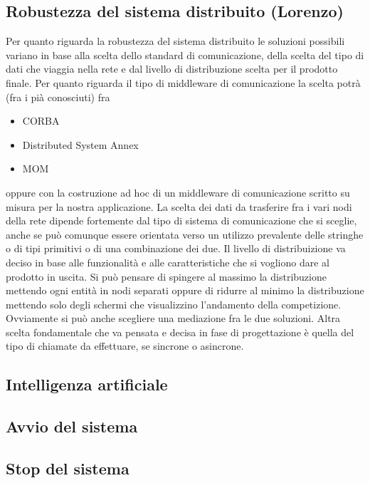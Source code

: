 \subsection{Robustezza del sistema distribuito (Lorenzo)}
Per quanto riguarda la robustezza del sistema distribuito le soluzioni possibili variano in base alla scelta dello standard di comunicazione, della scelta del tipo di dati che viaggia nella rete e dal livello di distribuzione scelta per il prodotto finale.
Per quanto riguarda il tipo di middleware di comunicazione la scelta potr\`{a} (fra i pià conosciuti) fra
\begin{itemize}
\item CORBA
\item Distributed System Annex 
\item MOM
\end{itemize}
oppure con la costruzione ad hoc di un middleware di comunicazione scritto su misura per la nostra applicazione.
La scelta dei dati da trasferire fra i vari nodi della rete dipende fortemente dal tipo di sistema di comunicazione che si sceglie, anche se può comunque essere orientata verso un utilizzo prevalente delle stringhe o di tipi primitivi o di una combinazione dei due. Il livello di distribuizione va deciso in base alle funzionalit\`{a} e alle caratteristiche che si vogliono dare al prodotto in uscita. Si può pensare di spingere al massimo la distribuzione mettendo ogni entit\`{a} in nodi separati oppure di ridurre al minimo la distribuzione mettendo solo degli schermi che visualizzino l'andamento della competizione. Ovviamente si pu\`{o} anche scegliere una mediazione fra le due soluzioni. Altra scelta fondamentale che va pensata e decisa in fase di progettazione \`{e} quella del tipo di chiamate da effettuare, se sincrone o asincrone.
\subsection{Intelligenza artificiale}
\subsection{Avvio del sistema}
\subsection{Stop del sistema}
